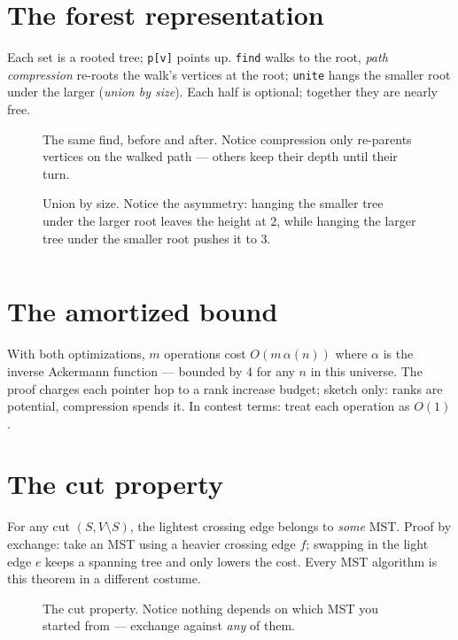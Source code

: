 \section{The forest representation}\label{sec:forest}
Each set is a rooted tree; \texttt{p[v]} points up. \texttt{find}
walks to the root, \emph{path compression} re-roots the walk's
vertices at the root; \texttt{unite} hangs the smaller root under the
larger (\emph{union by size}). Each half is optional; together they
are nearly free.
\begin{figure}[ht]\centering

\caption{The same find, before and after. Notice compression only
re-parents vertices on the walked path --- others keep their depth
until their turn.}
\label{fig:compress}
\end{figure}
\begin{figure}[ht]\centering

\caption{Union by size. Notice the asymmetry: hanging the smaller tree
under the larger root leaves the height at 2, while hanging the larger
tree under the smaller root pushes it to 3.}
\label{fig:unionsize}
\end{figure}
\begin{lstlisting}[language=C++,caption={\texttt{dsu.h}: path
halving + union by size + component sizes.},label={lst:dsu}]
\end{lstlisting}


\section{The amortized bound}\label{sec:ack}
With both optimizations, $m$ operations cost $O(m\,\alpha(n))$ where
$\alpha$ is the inverse Ackermann function --- bounded by 4 for any
$n$ in this universe. The proof charges each pointer hop to a rank
increase budget; sketch only: ranks are potential, compression spends
it. In contest terms: treat each operation as $O(1)$.

\section{The cut property}\label{sec:cut}
For any cut $(S, V\setminus S)$, the lightest crossing edge belongs
to \emph{some} MST. Proof by exchange: take an MST using a heavier
crossing edge $f$; swapping in the light edge $e$ keeps a spanning
tree and only lowers the cost. Every MST algorithm is this theorem in
a different costume.
\begin{figure}[ht]\centering

\caption{The cut property. Notice nothing depends on which MST you
started from --- exchange against \emph{any} of them.}
\label{fig:cutprop}
\end{figure}

